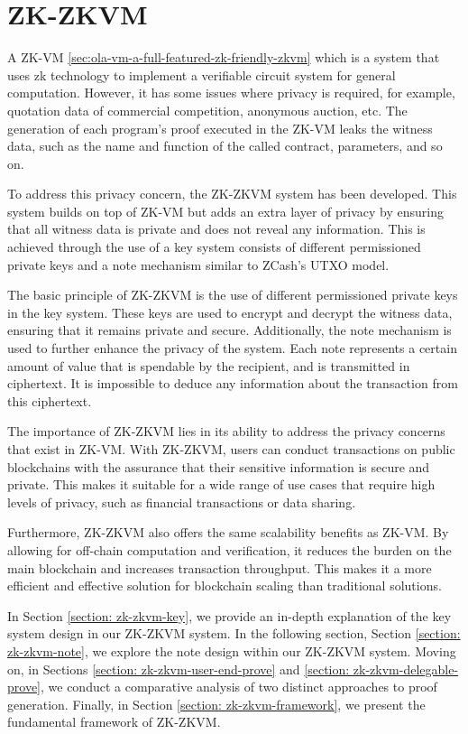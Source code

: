 \section{ZK-ZKVM} \label{sec:zk-zkvm}

A ZK-VM \ref{sec:ola-vm-a-full-featured-zk-friendly-zkvm} which is a system that uses zk technology to implement a verifiable circuit system for general computation. However, it has some issues where privacy is required, for example, quotation data of commercial competition, anonymous auction, etc. The generation of each program's proof executed in the ZK-VM leaks the witness data, such as the name and function of the called contract, parameters, and so on.

To address this privacy concern, the ZK-ZKVM system has been developed. This system builds on top of ZK-VM but adds an extra layer of privacy by ensuring that all witness data is private and does not reveal any information. This is achieved through the use of a key system consists of different permissioned private keys and a note mechanism similar to ZCash's UTXO model.

The basic principle of ZK-ZKVM is the use of different permissioned private keys in the key system. These keys are used to encrypt and decrypt the witness data, ensuring that it remains private and secure. Additionally, the note mechanism is used to further enhance the privacy of the system. Each note represents a certain amount of value that is spendable by the recipient, and is transmitted in ciphertext. It is impossible to deduce any information about the transaction from this ciphertext.

The importance of ZK-ZKVM lies in its ability to address the privacy concerns that exist in ZK-VM. With ZK-ZKVM, users can conduct transactions on public blockchains with the assurance that their sensitive information is secure and private. This makes it suitable for a wide range of use cases that require high levels of privacy, such as financial transactions or data sharing.

Furthermore, ZK-ZKVM also offers the same scalability benefits as ZK-VM. By allowing for off-chain computation and verification, it reduces the burden on the main blockchain and increases transaction throughput. This makes it a more efficient and effective solution for blockchain scaling than traditional solutions.

In Section \ref{section: zk-zkvm-key}, we provide an in-depth explanation of the key system design in our ZK-ZKVM system. In the following section, Section \ref{section: zk-zkvm-note}, we explore the note design within our ZK-ZKVM system. Moving on, in Sections \ref{section: zk-zkvm-user-end-prove} and \ref{section: zk-zkvm-delegable-prove}, we conduct a comparative analysis of two distinct approaches to proof generation. Finally, in Section \ref{section: zk-zkvm-framework}, we present the fundamental framework of ZK-ZKVM.





